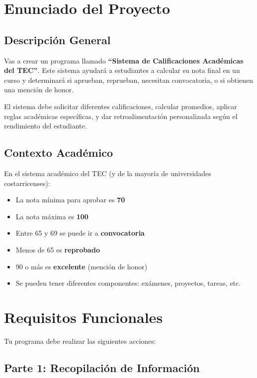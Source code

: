 \documentclass[12pt,a4paper]{article}
\begin{document}
\section{Enunciado del Proyecto}

\subsection{Descripción General}

Vas a crear un programa llamado \textbf{``Sistema de Calificaciones Académicas del TEC''}. Este sistema ayudará a estudiantes a calcular su nota final en un curso y determinará si aprueban, reprueban, necesitan convocatoria, o si obtienen una mención de honor.

El sistema debe solicitar diferentes calificaciones, calcular promedios, aplicar reglas académicas específicas, y dar retroalimentación personalizada según el rendimiento del estudiante.

\subsection{Contexto Académico}

En el sistema académico del TEC (y de la mayoría de universidades costarricenses):
\begin{itemize}
    \item La nota mínima para aprobar es \textbf{70}
    \item La nota máxima es \textbf{100}
    \item Entre 65 y 69 se puede ir a \textbf{convocatoria}
    \item Menos de 65 es \textbf{reprobado}
    \item 90 o más es \textbf{excelente} (mención de honor)
    \item Se pueden tener diferentes componentes: exámenes, proyectos, tareas, etc.
\end{itemize}

\section{Requisitos Funcionales}

Tu programa debe realizar las siguientes acciones:

\subsection{Parte 1: Recopilación de Información}
\end{document}
